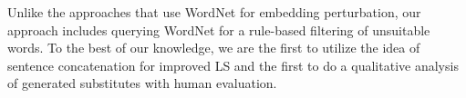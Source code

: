 Unlike the approaches that use WordNet for embedding perturbation, our approach includes querying WordNet for a rule-based filtering of unsuitable words.
To the best of our knowledge, we are the first to utilize the idea of sentence concatenation for improved LS and the first to do a qualitative analysis of generated substitutes with human evaluation.%


